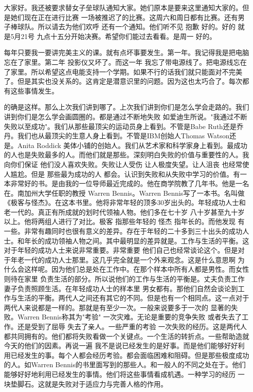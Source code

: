 大家好。我还被要求替女子垒球队通知大家。她们原本是要来这里通知大家的。但是她们现在正在进行比赛 一场被推迟了的比赛。这周六和周日都有比赛。还有男子棒球队。所以请去为他们欢呼 还有一个通知。他们听不见 抱歉 好的。好的 就是5月21号 九点十五分开始决赛。希望你们能过去看看。是周一 好的。 

每年只要我一要讲完美主义的课。就有点坏事要发生。第一年。我记得我是把电脑忘在了家里。第二年 投影仪又坏了。而这一年 我忘了带电源线了。把电源线忘在了家里。所以希望这点电能支持一个学期。如果不行的话我们就只能面对不完美了。但是其实也没关系的。这肯定是潜意识里的问题。因为这也太巧合了。每次都有这些事情发生。 

的确是这样。那么上次我们讲到哪了。上次我们讲到你们是怎么学会走路的。我们讲到你们是怎么学会画圆圈的。都是通过不断地失败 如爱迪生所说。"我通过不断失败以至成功"。我们从那些最顶尖的运动员身上看到。不管是Babe Ruth还是乔丹。我们也从最顶尖的生意人身上看到。不管是IBM创始人Thomas Watson还是。Anita Roddick 美体小铺的创始人。我们从艺术家和科学家身上看到。最成功的人也是失败最多的人。而他们就是那些。深刻明白失败的价值与重要性的人。我向你们保证 他们没人喜欢失败。失败让人受伤 让人极度失望。让人沮丧 也经常使人尴尬。但是 那些最为成功的人 都会。认识到失败和从失败中学习的价值。有一本非常好的书。是由我的一位导师最近完成的。他在商学院教了几年书。他是一名在。南加州大学任职的教授 Warren Bennis。Warren Bennis写了一本书。名叫做《极客与怪杰》。在这本书里。他将非常年轻的顶多30岁出头的。年轻成功人士和老一代的。真正有所成就的划时代领袖人物。他们多在七十岁 八十岁甚至九十岁以上。他将两组人进行了对比。极客 指那些年轻的 怪杰 指年长的。而他发现 有一些。非常有趣同时也很有意义的差异。存在于年轻的二十多到三十出头的成功人士。和年长的成功领袖人物之间。其中最明显的差异就是。工作与生活的平衡。这对于年轻的成功人士来说非常重要。非常重要 他们自己也经常谈论这个。但是对于年老一代的成功人士那里。这几乎完全就是一个外来观念。这是什么意思啊 为什么会这样呢。因为他们总是处在工作中。在那个样本中所有人都是男性。而女性则待在家里 负责生活的部分。所以说他们的工作与生活的平衡是。丈夫负责工作 妻子负责照顾生活。在年轻成功人士的样本里 男女都有。那他们自然会谈论到工作与生活的平衡。两代人之间还有其它的不同。但是也有一个相同点。这一点对于两代人来说都是一样的。那就是有至少一次。一般来说要多于一次的 显著的失败。Warren Bennis称其为"考验" 一次灾难。无论是重要的竞争失败 或者失去了工作。还是受到了屈辱 失去了亲人。一些严重的考验 一次失败的经历。这是两代人都共同拥有的。他们都将失败看做一个关键点。一个生活的转折点。一些帮助造就今天的他们的因素。再说一遍 我不是说已经发生的是好事。而是他们能够好好利用已经发生的事。每个人都会经历考验。都会面临困难和阻碍。但是那些极度成功的人。如Warren Bennis的书里面写到的那些人。和一般人的不同之处在于。他们能够好好地利用已经发生的事情。他们将这些事情看成机遇。一种学习的经历 一块垫脚石。这就是失败对于适应力与完善人格的作用。 

